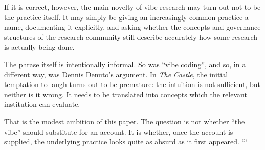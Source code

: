 If it is correct, however, the main novelty of vibe research may turn out not to be the practice itself. It may simply be giving an increasingly common practice a name, documenting it explicitly, and asking whether the concepts and governance structures of the research community still describe accurately how some research is actually being done.

The phrase itself is intentionally informal. So was ``vibe coding'', and so, in a different way, was Dennis Denuto's argument. In \emph{The Castle}, the initial temptation to laugh turns out to be premature: the intuition is not sufficient, but neither is it wrong. It needs to be translated into concepts which the relevant institution can evaluate.

That is the modest ambition of this paper. The question is not whether ``the vibe'' should substitute for an account. It is whether, once the account is supplied, the underlying practice looks quite as absurd as it first appeared.
```
